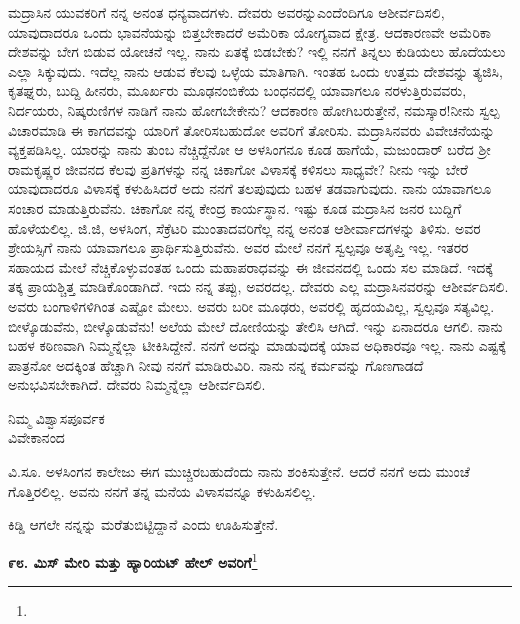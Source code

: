 ಮದ್ರಾಸಿನ ಯುವಕರಿಗೆ ನನ್ನ ಅನಂತ ಧನ್ಯವಾದಗಳು. ದೇವರು ಅವರನ್ನು\break ಎಂದೆಂದಿಗೂ ಆಶೀರ್ವದಿಸಲಿ, ಯಾವುದಾದರೂ ಒಂದು ಭಾವನೆಯನ್ನು ಬಿತ್ತಬೇಕಾದರೆ ಅಮೆರಿಕಾ ಯೋಗ್ಯವಾದ ಕ್ಷೇತ್ರ. ಆದಕಾರಣವೇ ಅಮೆರಿಕಾ ದೇಶವನ್ನು ಬೇಗ ಬಿಡುವ ಯೋಚನೆ ಇಲ್ಲ. ನಾನು ಏತಕ್ಕೆ ಬಿಡಬೇಕು? ಇಲ್ಲಿ ನನಗೆ ತಿನ್ನಲು ಕುಡಿಯಲು ಹೊದೆಯಲು ಎಲ್ಲಾ ಸಿಕ್ಕುವುದು. ಇದೆಲ್ಲ ನಾನು ಆಡುವ ಕೆಲವು ಒಳ್ಳೆಯ ಮಾತಿಗಾಗಿ. ಇಂತಹ ಒಂದು ಉತ್ತಮ ದೇಶವನ್ನು ತ್ಯಜಿಸಿ, ಕೃತಘ್ನರು, ಬುದ್ದಿ ಹೀನರು, ಮೂರ್ಖರು ಮೂಢನಂಬಿಕೆಯ ಬಂಧನದಲ್ಲಿ ಯಾವಾಗಲೂ ನರಳುತ್ತಿರುವವರು, ನಿರ್ದಯರು, ನಿಷ್ಕರುಣಿಗಳ ನಾಡಿಗೆ ನಾನು ಹೋಗಬೇಕೇನು? ಆದಕಾರಣ ಹೋಗಿಬರುತ್ತೇನೆ, ನಮಸ್ಕಾರ!ನೀನು ಸ್ವಲ್ಪ ವಿಚಾರಮಾಡಿ ಈ ಕಾಗದವನ್ನು ಯಾರಿಗೆ ತೋರಿಸಬಹುದೋ ಅವರಿಗೆ ತೋರಿಸು. ಮದ್ರಾಸಿನವರು ವಿವೇಚನೆಯನ್ನು ವ್ಯಕ್ತಪಡಿಸಿಲ್ಲ. ಯಾರನ್ನು ನಾನು ತುಂಬ ನೆಚ್ಚಿದ್ದೆನೋ ಆ ಅಳಸಿಂಗನೂ ಕೂಡ ಹಾಗೆಯೆ, ಮಜುಂದಾರ್ ಬರೆದ ಶ‍್ರೀ ರಾಮಕೃಷ್ಣರ ಜೀವನದ ಕೆಲವು ಪ್ರತಿಗಳನ್ನು ನನ್ನ ಚಿಕಾಗೋ ವಿಳಾಸಕ್ಕೆ ಕಳಿಸಲು ಸಾಧ್ಯವೇ? ನೀನು ಇನ್ನು ಬೇರೆ ಯಾವುದಾದರೂ ವಿಳಾಸಕ್ಕೆ ಕಳುಹಿಸಿದರೆ ಅದು ನನಗೆ ತಲಪುವುದು ಬಹಳ ತಡವಾಗುವುದು. ನಾನು ಯಾವಾಗಲೂ ಸಂಚಾರ ಮಾಡುತ್ತಿರುವೆನು. ಚಿಕಾಗೋ ನನ್ನ ಕೇಂದ್ರ ಕಾರ್ಯಸ್ಥಾನ. ಇಷ್ಟು ಕೂಡ ಮದ್ರಾಸಿನ ಜನರ ಬುದ್ದಿಗೆ ಹೊಳೆಯಲಿಲ್ಲ. ಜಿ.ಜಿ, ಅಳಸಿಂಗ, ಸೆಕ್ರೆಟರಿ ಮುಂತಾದವರಿಗೆಲ್ಲ ನನ್ನ ಅನಂತ ಆಶೀರ್ವಾದಗಳನ್ನು ತಿಳಿಸು. ಅವರ ಶ್ರೇಯಸ್ಸಿಗೆ ನಾನು ಯಾವಾಗಲೂ ಪ್ರಾರ್ಥಿಸುತ್ತಿರುವೆನು. ಅವರ ಮೇಲೆ ನನಗೆ ಸ್ವಲ್ಪವೂ ಅತೃಪ್ತಿ ಇಲ್ಲ. ಇತರರ ಸಹಾಯದ ಮೇಲೆ ನೆಚ್ಚಿಕೊಳ್ಳುವಂತಹ ಒಂದು ಮಹಾಪರಾಧವನ್ನು ಈ ಜೀವನದಲ್ಲಿ ಒಂದು ಸಲ ಮಾಡಿದೆ. ಇದಕ್ಕೆ ತಕ್ಕ ಪ್ರಾಯಶ್ಚಿತ್ತ ಮಾಡಿಕೊಂಡಾಗಿದೆ. ಇದು ನನ್ನ ತಪ್ಪು, ಅವರದಲ್ಲ. ದೇವರು ಎಲ್ಲ ಮದ್ರಾಸಿನವರನ್ನು ಆಶೀರ್ವದಿಸಲಿ. ಅವರು ಬಂಗಾಳಿಗಳಿಗಿಂತ ಎಷ್ಟೋ ಮೇಲು. ಅವರು ಬರೀ ಮೂಢರು, ಅವರಲ್ಲಿ ಹೃದಯವಿಲ್ಲ, ಸ್ವಲ್ಪವೂ ಸತ್ಯವಿಲ್ಲ. ಬೀಳ್ಕೊಡುವೆನು, ಬೀಳ್ಕೊಡುವೆನು! ಅಲೆಯ ಮೇಲೆ ದೋಣಿಯನ್ನು ತೇಲಿಸಿ ಆಗಿದೆ. ಇನ್ನು ಏನಾದರೂ ಆಗಲಿ. ನಾನು ಬಹಳ ಕಠಿಣವಾಗಿ ನಿಮ್ಮನ್ನೆಲ್ಲಾ ಟೀಕಿಸಿದ್ದೇನೆ. ನನಗೆ ಅದನ್ನು ಮಾಡುವುದಕ್ಕೆ ಯಾವ ಅಧಿಕಾರವೂ ಇಲ್ಲ. ನಾನು ಎಷ್ಟಕ್ಕೆ ಪಾತ್ರನೋ ಅದಕ್ಕಿಂತ ಹೆಚ್ಚಾಗಿ ನೀವು ನನಗೆ ಮಾಡಿರುವಿರಿ. ನಾನು ನನ್ನ ಕರ್ಮವನ್ನು ಗೊಣಗಾಡದೆ ಅನುಭವಿಸಬೇಕಾಗಿದೆ. ದೇವರು ನಿಮ್ಮನ್ನೆಲ್ಲಾ ಆಶೀರ್ವದಿಸಲಿ.

\vspace{-0.5cm}

\begin{flushright}
ನಿಮ್ಮ ವಿಶ್ವಾಸಪೂರ್ವಕ\\ವಿವೇಕಾನಂದ
\end{flushright}

\vspace{-0.3cm}

ವಿ.ಸೂ. \enginline{-}ಅಳಸಿಂಗನ ಕಾಲೇಜು ಈಗ ಮುಚ್ಚಿರಬಹುದೆಂದು ನಾನು ಶಂಕಿಸುತ್ತೇನೆ. ಆದರೆ ನನಗೆ ಅದು ಮುಂಚೆ ಗೊತ್ತಿರಲಿಲ್ಲ. ಅವನು ನನಗೆ ತನ್ನ ಮನೆಯ ವಿಳಾಸವನ್ನೂ ಕಳುಹಿಸಲಿಲ್ಲ.

ಕಿಡ್ಡಿ ಆಗಲೇ ನನ್ನನ್ನು ಮರೆತುಬಿಟ್ಟಿದ್ದಾನೆ ಎಂದು ಊಹಿಸುತ್ತೇನೆ.

\vfill\eject

\begin{center}
\textbf{೯೮. ಮಿಸ್ ಮೇರಿ ಮತ್ತು ಹ್ಯಾರಿಯಟ್ ಹೇಲ್‌ ಅವರಿಗೆ}\footnote{}
\end{center}

